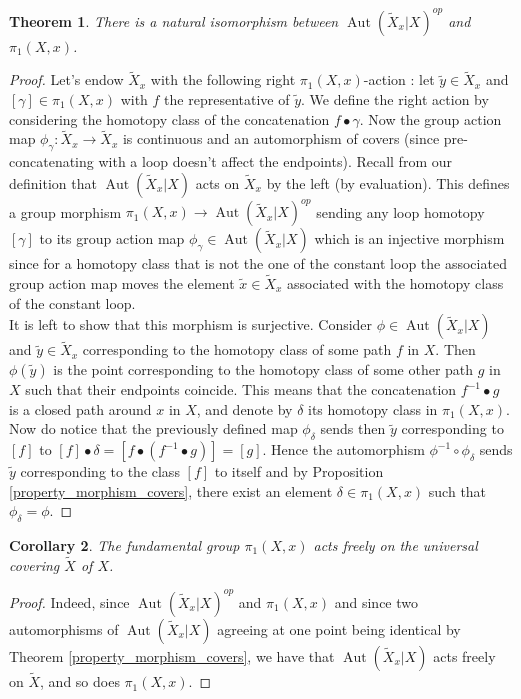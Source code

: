 \documentclass{article}
\theoremstyle{plain}
\newtheorem{theorem}{Theorem}[subsection]
\newtheorem{corollary}[theorem]{Corollary}
\theoremstyle{definition}
\DeclareMathOperator{\Aut}{Aut}
\begin{document}
\begin{theorem}
\label{aut_iso_fund}
    There is a natural isomorphism between $\Aut(\widetilde{X}_x|X)^{op}$ and $\pi_1(X,x)$.
\end{theorem}
\begin{proof}
    Let's endow $\widetilde{X}_x$ with the following right $\pi_1(X,x)$-action : let $\widetilde{y}\in \widetilde{X}_x$ and $[\gamma]\in\pi_1(X,x)$ with $f$ the representative of $\widetilde{y}$. 
    We define the right action by considering the homotopy class of the concatenation $f \bullet \gamma$.
    Now the group action map $\phi_{\gamma}:\widetilde{X}_x \rightarrow \widetilde{X}_x$ is continuous and an automorphism of covers (since pre-concatenating with a loop doesn't affect the endpoints).
    Recall from our definition that $\Aut(\widetilde{X}_x|X)$ acts on $\widetilde{X}_x$ by the left (by evaluation).
    This defines a group morphism $\pi_1(X,x)\rightarrow \Aut(\widetilde{X}_x|X)^{op}$ sending any loop homotopy $[\gamma]$ to its group action map $\phi_{\gamma}\in \Aut(\widetilde{X}_x|X)$ which is an injective morphism since for a homotopy class that is not the one of the constant loop the associated group action map moves the element $\widetilde{x}\in\widetilde{X}_x$ associated with the homotopy class of the constant loop.\\
    It is left to show that this morphism is surjective.
    Consider $\phi\in \Aut(\widetilde{X}_x|X)$ and $\widetilde{y}\in\widetilde{X}_x$ corresponding to the homotopy class of some path $f$ in $X$. Then $\phi(\widetilde{y})$ is the point corresponding to the homotopy class of some other path $g$ in $X$ such that their endpoints coincide. 
    This means that the concatenation $f^{-1}\bullet g$ is a closed path around $x$ in $X$, and denote by $\delta$ its homotopy class in $\pi_1(X,x)$. Now do notice that the previously defined map $\phi_{\delta}$ sends then $\widetilde{y}$ corresponding to $[f]$ to $[f]\bullet\delta = [f\bullet (f^{-1}\bullet g)] = [g]$.
    Hence the automorphism $\phi^{-1}\circ\phi_{\delta}$ sends $\widetilde{y}$ corresponding to the class $[f]$ to itself and by Proposition \ref{property_morphism_covers}, there exist an element $\delta\in\pi_1(X,x)$ such that $\phi_{\delta} = \phi$.
\end{proof}

\begin{corollary}
\label{free_action_universal}
    The fundamental group $\pi_1(X,x)$ acts freely on the universal covering $\widetilde{X}$ of $X$.
\end{corollary}
\begin{proof}
    Indeed, since $\Aut(\widetilde{X}_x|X)^{op}$ and $\pi_1(X,x)$ and since two automorphisms of $\Aut(\widetilde{X}_x|X)$ agreeing at one point being identical by Theorem \ref{property_morphism_covers}, we have that $\Aut(\widetilde{X}_x|X)$ acts freely on $\widetilde{X}$, and so does $\pi_1(X,x)$.
\end{proof}
\end{document}
